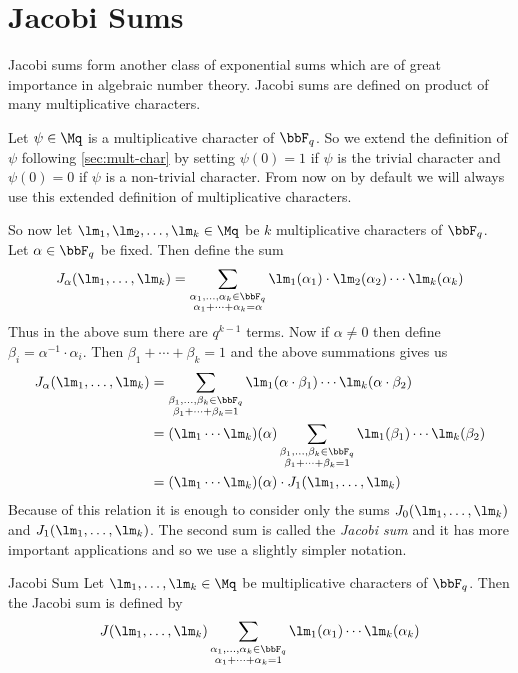 \section{Jacobi Sums}
Jacobi sums form another class of exponential sums which are of great importance in algebraic number theory. Jacobi sums are defined on product of many multiplicative characters. 

Let $\psi\in\Mq$ is a multiplicative character of $\bbF_q$. So we extend the definition of $\psi$ following \autoref{sec:mult-char} by setting $\psi(0)=1$ if $\psi$ is the trivial character and $\psi(0)=0$ if $\psi$ is a non-trivial character. From now on by default we will always use this extended definition of multiplicative characters. 

So now let $\lm_1,\lm_2,\dots, \lm_k\in\Mq$ be $k$ multiplicative characters of $\bbF_q$. Let $\alpha\in \bbF_q$ be fixed. Then define the sum $$J_{\alpha}(\lm_1,\dots, \lm_k)=\sum_{\substack{\alpha_1,\dots,\alpha_k\in\bbF_q\\ \alpha_1+\cdots+\alpha_k=\alpha}}\lm_1(\alpha_1)\cdot \lm_2(\alpha_2)\cdots\lm_k(\alpha_k)$$Thus in the above sum there are $q^{k-1}$ terms. Now if $\alpha\neq 0$ then define $\beta_i=\alpha^{-1}\cdot \alpha_i$. Then $\beta_1+\cdots+\beta_k=1$ and the above summations gives us \begin{align*}
  J_{\alpha}(\lm_1,\dots, \lm_k) & = \sum_{\substack{\beta_1,\dots,\beta_k\in\bbF_q\\ \beta_1+\cdots+\beta_k=1}}\lm_1(\alpha\cdot \beta_1)\cdots\lm_k(\alpha\cdot \beta_2)\\ 
  & = (\lm_1\cdots\lm_k)(\alpha)\sum_{\substack{\beta_1,\dots,\beta_k\in\bbF_q\\ \beta_1+\cdots+\beta_k=1}}\lm_1(\beta_1)\cdots\lm_k(\beta_2)\\ 
  & = (\lm_1\cdots\lm_k)(\alpha)\cdot J_1(\lm_1,\dots, \lm_k)
\end{align*}
Because of this relation it is enough to consider only the sums $J_0(\lm_1,\dots, \lm_k)$ and $J_1(\lm_1,\dots, \lm_k)$. The second sum is called the \emph{Jacobi sum} and it has more important applications and so we use a slightly simpler notation. 
\begin{Definition}{Jacobi Sum}{}
  Let $\lm_1,\dots, \lm_k\in\Mq$ be multiplicative characters of $\bbF_q$. Then the Jacobi sum is defined by $$J(\lm_1,\dots, \lm_k)\sum_{\substack{\alpha_1,\dots,\alpha_k\in\bbF_q\\ \alpha_1+\cdots+\alpha_k=1}}\lm_1(\alpha_1)\cdots\lm_k(\alpha_k)$$
\end{Definition} 


